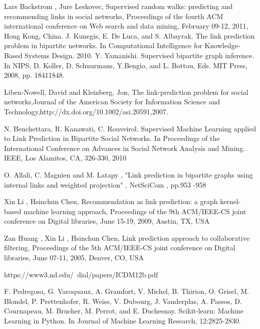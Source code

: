 \documentclass[letterpaper,twocolumn,11pt]{article}
\begin{document}

\begin{thebibliography}{100}
	 Lars Backstrom , Jure Leskovec, Supervised random walks: predicting and recommending links in social networks, Proceedings of the fourth ACM international conference on Web search and data mining, February 09-12, 2011, Hong Kong, China.   
     J. Kunegis, E. De Luca, and S. Albayrak. The link prediction problem in bipartite networks. In Computational Intelligence for Knowledge-Based Systems Design. 2010.
	 Y. Yamanishi. Supervised bipartite graph inference. In NIPS, D. Koller, D. Schuurmans, Y.Bengio, and L. Bottou, Eds. MIT Press, 2008, pp. 18411848.
    
     Liben-Nowell, David and Kleinberg, Jon, The link-prediction problem for social networks,Journal of the American Society for Information Science and Technology,http://dx.doi.org/10.1002/asi.20591,2007.

     N. Benchettara, R. Kanawati, C. Rouveirol. Supervised Machine Learning applied to Link Prediction in Bipartite Social Networks. In Proceedings of the International Conference on Advances in Social Network Analysis and Mining. IEEE, Los Alamitos, CA, 326-330, 2010
    
    O. Allali, C. Magnien and M. Latapy , "Link prediction in bipartite graphs using internal links and weighted projection" ,  NetSciCom , pp.953 -958 
   
    Xin Li , Hsinchun Chen, Recommendation as link prediction: a graph kernel-based machine learning approach, Proceedings of the 9th ACM/IEEE-CS joint conference on Digital libraries, June 15-19, 2009, Austin, TX, USA
   
    Zan Huang , Xin Li , Hsinchun Chen, Link prediction approach to collaborative filtering, Proceedings of the 5th ACM/IEEE-CS joint conference on Digital libraries, June 07-11, 2005, Denver, CO, USA 
    
     https://www3.nd.edu/~dial/papers/ICDM12b.pdf
    
     F. Pedregosa, G. Varoquaux, A. Gramfort, V. Michel, B. Thirion, O. Grisel, M. Blondel, P.
Prettenhofer, R. Weiss, V. Dubourg, J. Vanderplas, A. Passos, D. Cournapeau, M. Brucher, M.
Perrot, and E. Duchesnay. Scikit-learn: Machine Learning in Python. In Journal of Machine
Learning Research, 12:2825-2830.
    
\end{thebibliography}
\end{document}
